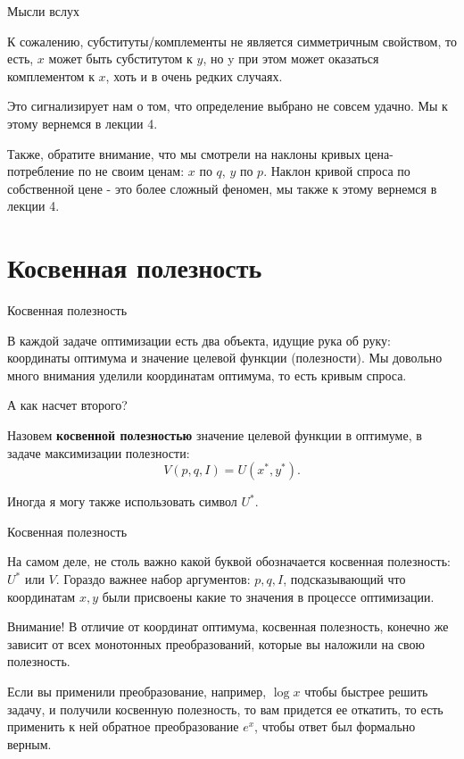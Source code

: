 \documentclass{beamer}
\begin{document}
\begin{frame}{Мысли вслух}

К сожалению, субституты/комплементы не является симметричным свойством, то есть, $x$ может быть субститутом к $y$, но y при этом может оказаться комплементом к $x$, хоть и в очень редких случаях. 

Это сигнализирует нам о том, что определение выбрано не совсем удачно. Мы к этому вернемся в лекции 4.

Также, обратите внимание, что мы смотрели на наклоны кривых цена-потребление по не своим ценам: $x$ по $q$, $y$ по $p$. Наклон кривой спроса по собственной цене - это более сложный феномен, мы также к этому вернемся в лекции 4.

\end{frame}

\section{Косвенная полезность}

\begin{frame}{Косвенная полезность}

В каждой задаче оптимизации есть два объекта, идущие рука об руку: координаты оптимума и значение целевой функции (полезности). Мы довольно много внимания уделили координатам оптимума, то есть кривым спроса. 

А как насчет второго?

\begin{definition}
Назовем \textbf{косвенной полезностью} значение целевой функции в оптимуме, в задаче максимизации полезности:
$$ V(p,q,I) = U(x^{\ast}, y^{\ast}).$$
\end{definition}
Иногда я могу также использовать символ $U^{\ast}$.

\end{frame}

\begin{frame}{Косвенная полезность}

На самом деле, не столь важно какой буквой обозначается косвенная полезность: $U^{\ast}$ или $V$. Гораздо важнее набор аргументов: $p,q, I$, подсказывающий что координатам $x,y$ были присвоены какие то значения в процессе оптимизации.


Внимание! В отличие от координат оптимума, косвенная полезность, конечно же зависит от всех монотонных преобразований, которые вы наложили на свою полезность.

Если вы применили преобразование, например, $\log x$ чтобы быстрее решить задачу, и получили косвенную полезность, то вам придется ее откатить, то есть применить к ней обратное преобразование $e^x$, чтобы ответ был формально верным.

\end{frame}
\end{document}
